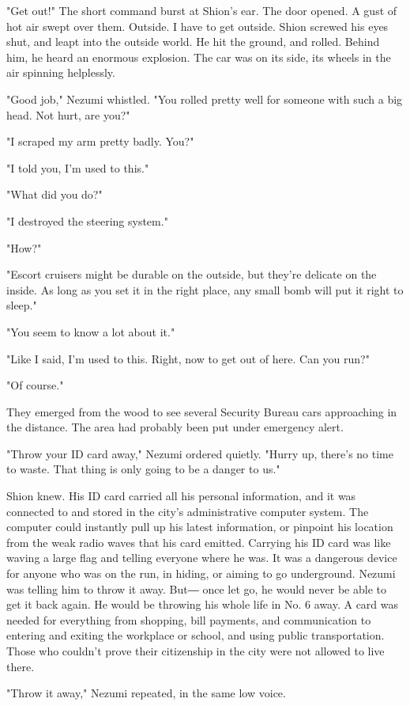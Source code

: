 "Get out!" The short command burst at Shion's ear. The door opened. A
gust of hot air swept over them. Outside. I have to get outside. Shion
screwed his eyes shut, and leapt into the outside world. He hit the
ground, and rolled. Behind him, he heard an enormous explosion. The car
was on its side, its wheels in the air spinning helplessly.

"Good job," Nezumi whistled. "You rolled pretty well for someone with
such a big head. Not hurt, are you?"

"I scraped my arm pretty badly. You?"

"I told you, I'm used to this."

"What did you do?"

"I destroyed the steering system."

"How?"

"Escort cruisers might be durable on the outside, but they're delicate
on the inside. As long as you set it in the right place, any small bomb
will put it right to sleep."

"You seem to know a lot about it."

"Like I said, I'm used to this. Right, now to get out of here. Can you
run?"

"Of course."

They emerged from the wood to see several Security Bureau cars
approaching in the distance. The area had probably been put under
emergency alert.

"Throw your ID card away," Nezumi ordered quietly. "Hurry up, there's no
time to waste. That thing is only going to be a danger to us."

Shion knew. His ID card carried all his personal information, and it was
connected to and stored in the city's administrative computer system.
The computer could instantly pull up his latest information, or pinpoint
his location from the weak radio waves that his card emitted. Carrying
his ID card was like waving a large flag and telling everyone where he
was. It was a dangerous device for anyone who was on the run, in hiding,
or aiming to go underground. Nezumi was telling him to throw it away.
But― once let go, he would never be able to get it back again. He would
be throwing his whole life in No. 6 away. A card was needed for
everything from shopping, bill payments, and communication to entering
and exiting the workplace or school, and using public transportation.
Those who couldn't prove their citizenship in the city were not allowed
to live there.

"Throw it away," Nezumi repeated, in the same low voice.

